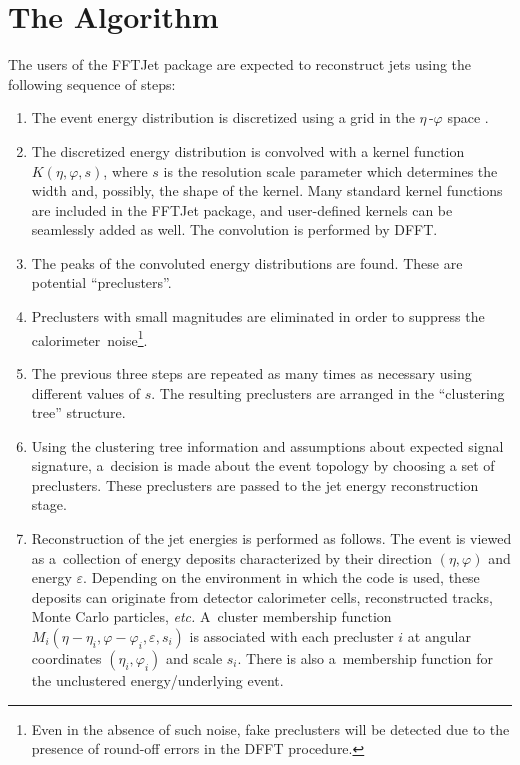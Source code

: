 \documentclass[epsf,12pt,titlepage]{article}
\def\epspace {$\eta$\,-$\varphi$ space }
\begin{document}
\section{The Algorithm}

The users of the FFTJet package are expected to reconstruct jets
using the following sequence of steps:
\begin{enumerate}
\item The event energy distribution is discretized using a grid in the
      \epspace$\!\!$.

\item The discretized energy distribution is convolved with a kernel function
      $K(\eta, \varphi, s)$,
      where $s$ is the resolution
      scale parameter which determines the width and,
      possibly, the shape of the kernel. Many standard kernel functions are
      included in the FFTJet package, and user-defined kernels can be
      seamlessly added as well. The convolution is performed by DFFT.

\item The peaks of the convoluted energy distributions are found. These
      are potential ``preclusters''.

\item Preclusters with small magnitudes are eliminated in order
      to suppress the calorimeter~noise\footnote{Even in the
      absence of such noise, fake preclusters will be detected due to
      the presence of round-off errors in the DFFT procedure.}.

\item The previous three steps are repeated as many times as necessary
      using different values of $s$. The resulting preclusters are
      arranged in the ``clustering tree'' structure.

\item Using the clustering tree information and assumptions about
      expected signal signature, a~decision is made about the event topology
      by choosing a set of preclusters. These preclusters are passed to
      the jet energy reconstruction stage.

\item Reconstruction of the jet energies is performed
      as follows. The event is viewed as a~collection of energy deposits
      characterized by their direction $(\eta, \varphi)$ and
      energy $\varepsilon$.
      Depending on the environment in which the code is used,
      these deposits can originate from
      detector calorimeter cells, reconstructed tracks,
      Monte Carlo particles, {\it etc.}
      A~cluster membership function
      $M_{i}(\eta - \eta_i, \varphi - \varphi_i, \varepsilon, s_i)$
      is associated with
      each precluster $i$ at angular coordinates
      $(\eta_i, \varphi_i)$ and scale $s_i$. There is also a~membership function
      for the unclustered energy/underlying event. 


\end{enumerate}
\end{document}
